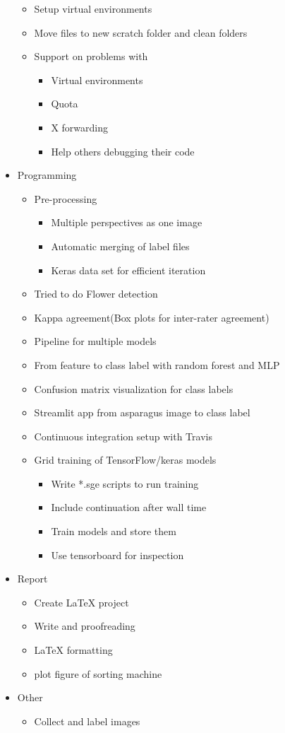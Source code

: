 \begin{itemize}
\begin{itemize}
\item Setup virtual environments
\item Move files to new scratch folder and clean folders
\item Support on problems with
\begin{itemize}
\item Virtual environments
\item Quota
\item X forwarding
\item Help others debugging their code
\end{itemize}
\end{itemize}
\item Programming
\begin{itemize}
\item Pre-processing
\begin{itemize}
\item Multiple perspectives as one image
\item Automatic merging of label files
\item Keras data set for efficient iteration
\end{itemize}
\item Tried to do Flower detection
\item Kappa agreement(Box plots for inter-rater agreement)
\item Pipeline for multiple models
\item From feature to class label with random forest and MLP
\item Confusion matrix visualization for class labels
\item Streamlit app from asparagus image to class label
\item Continuous integration setup with Travis
\item Grid training of TensorFlow/keras models
\begin{itemize}
\item Write *.sge scripts to run training
\item Include continuation after wall time
\item Train models and store them
\item Use tensorboard for inspection
\end{itemize}
\end{itemize}
\item Report
\begin{itemize}
\item Create LaTeX project
\item Write and proofreading
\item LaTeX formatting
\item plot figure of sorting machine
\end{itemize}
\item Other
\begin{itemize}
\item Collect and label images
\end{itemize}
\end{itemize}


